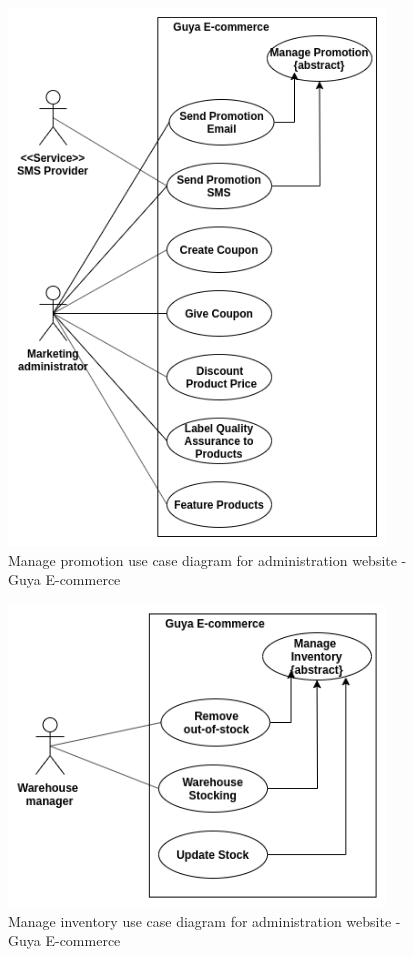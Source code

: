 \begin{figure}[!ht]
\centering
\includegraphics[width=10cm,keepaspectratio]{usecases/manage_promotion}
\caption{Manage promotion use case diagram for administration website - Guya E-commerce}
\end{figure}

\begin{figure}[!ht]
\centering
\includegraphics[width=10cm,keepaspectratio]{usecases/manage_inventory}
\caption{Manage inventory use case diagram for administration website - Guya E-commerce}
\end{figure}

